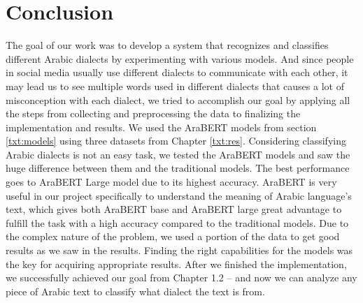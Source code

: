 \documentclass[12pt]{diazessay}
\begin{document}
    \section {Conclusion}
    The goal of our work was to develop a system that recognizes and classifies different Arabic dialects by experimenting with various models. And since people in social media usually use different dialects to communicate with each other, it may lead us to see multiple words used in different dialects that causes a lot of misconception with each dialect, we tried to accomplish our goal by applying all the steps from collecting and preprocessing the data to finalizing the implementation and results. We used the AraBERT models from section \ref{txt:models} using three datasets from Chapter \ref{txt:res}. Considering classifying Arabic dialects is not an easy task, we tested the AraBERT models and saw the huge difference between them and the traditional models. The best performance goes to AraBERT Large model due to its highest accuracy. AraBERT is very useful in our project specifically to understand the meaning of Arabic language’s text, which gives both AraBERT base and AraBERT large great advantage to fulfill the task with a high accuracy compared to the traditional models. Due to the complex nature of the problem, we used a portion of the data to get good results as we saw in the results. Finding the right capabilities for the models was the key for acquiring appropriate results. After we finished the implementation, we successfully achieved our goal from Chapter 1.2 – and now we can analyze any piece of Arabic text to classify what dialect the text is from.



\newpage
\end{document}
